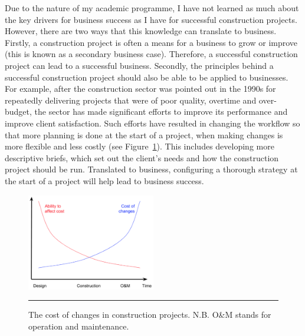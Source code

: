 Due to the nature of my academic programme, I have not learned as much about the key drivers for business success as I have for successful construction projects.
However, there are two ways that this knowledge can translate to business.
Firstly, a construction project is often a means for a business to grow or improve (this is known as a secondary business case).
Therefore, a successful construction project can lead to a successful business.
Secondly, the principles behind a successful construction project should also be able to be applied to businesses.
For example, after the construction sector was pointed out in the 1990s for repeatedly delivering projects that were of poor quality, overtime and over-budget, the sector has made significant efforts to improve its performance and improve client satisfaction.
Such efforts have resulted in changing the workflow so that more planning is done at the start of a project, when making changes is more flexible and less costly (see Figure~\ref{fig:cost_V_time}).
This includes developing more descriptive briefs, which set out the client's needs and how the construction project should be run.
Translated to business, configuring a thorough strategy at the start of a project will help lead to business success.


\begin{figure}[htbp]
	\centering
	\includegraphics[width=0.5\textwidth]{figures/cost_V_time.png}
	\rule{\textwidth}{0.5pt} %
	\caption[The cost of changes in construction projects.]{The cost of changes in construction projects. N.B. O{\&}M stands for operation and maintenance.}
	\label{fig:cost_V_time}
\end{figure}